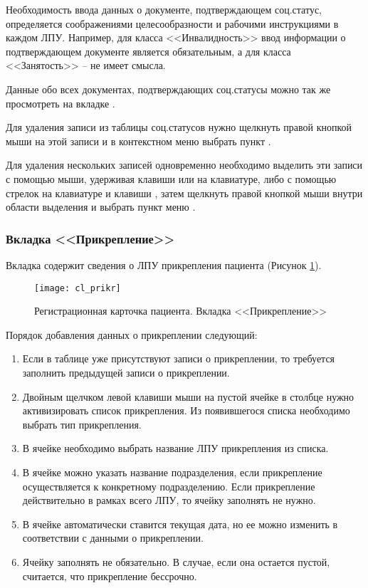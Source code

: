 Необходимость ввода данных о документе, подтверждающем соц.статус, определяется соображениями целесообразности и рабочими инструкциями в каждом ЛПУ. Например, для класса <<Инвалидность>> ввод информации о подтверждающем документе является обязательным, а для класса <<Занятость>> – не имеет смысла.

\begin{prim}
Данные обо всех документах, подтверждающих соц.статусы можно так же просмотреть на вкладке .
\end{prim}
 
Для удаления записи из таблицы соц.статусов нужно щелкнуть правой кнопкой мыши на этой записи и в контекстном меню выбрать пункт .

\begin{prim}
Для удаления нескольких записей одновременно необходимо выделить эти записи с помощью мыши, удерживая клавиши  или  на клавиатуре, либо с помощью стрелок на клавиатуре и клавиши , затем щелкнуть правой кнопкой мыши внутри области выделения и выбрать пункт меню .
\end{prim}

\subsubsection{Вкладка <<Прикрепление>>}

Вкладка  содержит сведения о ЛПУ прикрепления пациента (Рисунок \ref{img_cl_prikr}).

\begin{figure}[ht]\centering
 \texttt{[image: cl\_prikr]}
 \caption{Регистрационная карточка пациента. Вкладка <<Прикрепление>>}
 \label{img_cl_prikr}
\end{figure} 

Порядок добавления данных о прикреплении следующий:
\begin{enumerate}
 \item Если в таблице уже присутствуют записи о прикреплении, то требуется заполнить  предыдущей записи о прикреплении.
 \item Двойным щелчком левой клавиши мыши на пустой ячейке в столбце  нужно активизировать список прикрепления. Из появившегося списка необходимо выбрать тип прикрепления.
 \item В ячейке  необходимо выбрать название ЛПУ прикрепления из списка.
 \item В ячейке  можно указать название подразделения, если прикрепление осуществляется к конкретному подразделению. Если прикрепление действительно в рамках всего ЛПУ, то ячейку заполнять не нужно.
 \item В ячейке  автоматически ставится текущая дата, но ее можно изменить в соответствии с данными о прикреплении.
 \item Ячейку  заполнять не обязательно. В случае, если она остается пустой, считается, что прикрепление бессрочно.
\end{enumerate}
 
